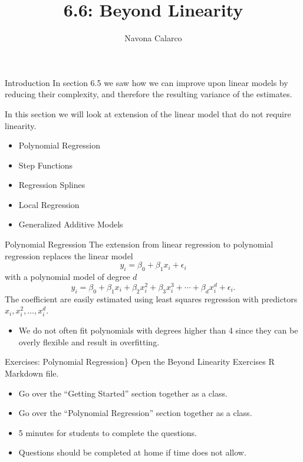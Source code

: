 \documentclass[
  ignorenonframetext,
  aspectratio=169,
]{beamer}
\title{6.6: Beyond Linearity}
\author{Navona Calarco}
\date{}
\institute{The University of Toronto}
\providecommand{\tightlist}{%
  \setlength{\itemsep}{0pt}\setlength{\parskip}{0pt}}\usepackage{longtable,booktabs,array}
\begin{document}
\frame{\titlepage}
\ifdefined\Shaded\renewenvironment{Shaded}{\begin{tcolorbox}[boxrule=0pt, borderline west={3pt}{0pt}{shadecolor}, breakable, sharp corners, frame hidden, enhanced, interior hidden]}{\end{tcolorbox}}\fi

\begin{frame}{Introduction}
\protect\hypertarget{introduction}{}
In section 6.5 we saw how we can improve upon linear models by reducing
their complexity, and therefore the resulting variance of the estimates.

In this section we will look at extension of the linear model that do
not require linearity.

\begin{itemize}
\item
  Polynomial Regression
\item
  Step Functions
\item
  Regression Splines
\item
  Local Regression
\item
  Generalized Additive Models
\end{itemize}
\end{frame}

\begin{frame}{Polynomial Regression}
\protect\hypertarget{polynomial-regression}{}
The extension from linear regression to polynomial regression replaces
the linear model \[
y_{i}=\beta_{0}+\beta_{1} x_{i}+\epsilon_{i}
\] with a polynomial model of degree \(d\) \[
y_{i}=\beta_{0}+\beta_{1} x_{i}+\beta_{2} x_{i}^{2}+\beta_{3} x_{i}^{3}+\cdots+\beta_{d} x_{i}^{d}+\epsilon_{i}.
\] The coefficient are easily
\alert{estimated using least squares regression} with predictors
\(x_{i}, x_{i}^{2}, \ldots, x_{i}^{d}\).

\begin{itemize}
\tightlist
\item
  We do not often fit polynomials with degrees higher than 4 since they
  can be overly flexible and result in overfitting.
\end{itemize}
\end{frame}

\begin{frame}{Exercises: Polynomial Regression\}}
\protect\hypertarget{exercises-polynomial-regression}{}
Open the Beyond Linearity Exercises R Markdown file.

\begin{itemize}
\item
  Go over the ``Getting Started'' section together as a class.
\item
  Go over the ``Polynomial Regression'' section together as a class.
\item
  5 minutes for students to complete the questions.
\item
  Questions should be completed at home if time does not allow.
\end{itemize}
\end{frame}
\end{document}
